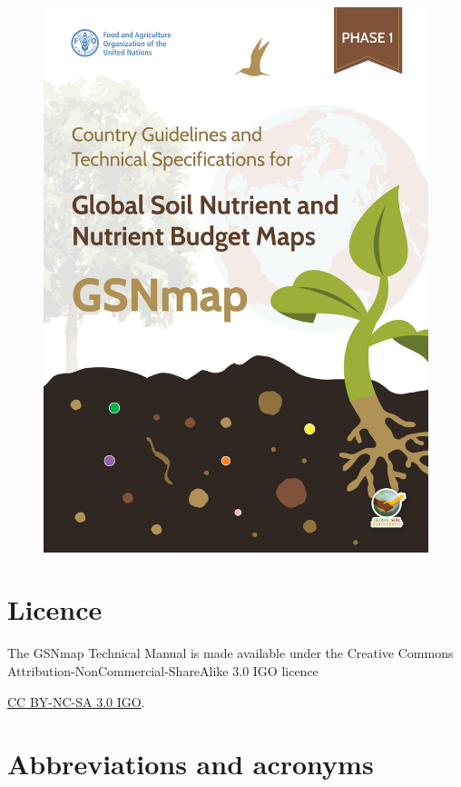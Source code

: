 \documentclass[
  10pt,
  b5paper,
  oneside]{book}
\begin{document}
\begin{figure}
\includegraphics[width=34.46in]{images/frontcover} \end{figure}

\hypertarget{licence}{%
\chapter*{Licence}\label{licence}}

The GSNmap Technical Manual is made available under the Creative Commons Attribution-NonCommercial-ShareAlike 3.0 IGO licence

\href{https://creativecommons.org/licenses/by-nc-sa/3.0/igo/legalcode}{CC BY-NC-SA 3.0 IGO}.

\hypertarget{abbreviations-and-acronyms}{%
\chapter*{Abbreviations and acronyms}\label{abbreviations-and-acronyms}}
\end{document}
